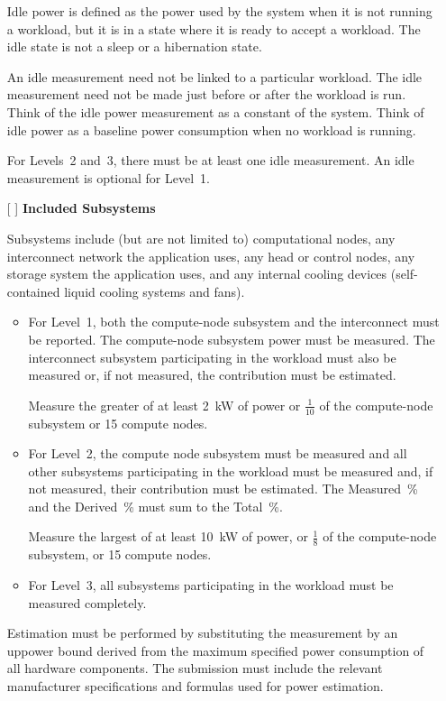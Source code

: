 \begin{itemize}
Idle power is defined as the power used by the system when it is not running a workload, but it is in a state where it is ready to accept a workload.
The idle state is not a sleep or a hibernation state.

An idle measurement need not be linked to a particular workload.
The idle measurement need not be made just before or after the workload is run.
Think of the idle power measurement as a constant of the system.
Think of idle power as a baseline power consumption when no workload is running.

For Levels~2 and~3, there must be at least one idle measurement.
An idle measurement is optional for Level~1.

\newpage
\item[{[ ]}]
\textbf{Included Subsystems}

Subsystems include (but are not limited to) computational nodes, any interconnect network the application uses, any head or control nodes, any storage system the application uses, and any internal cooling devices (self-contained liquid cooling systems and fans).

\begin{itemize}
\item
For Level~1, both the compute-node subsystem and the interconnect must be reported.
The compute-node subsystem power must be measured.
The interconnect subsystem participating in the workload must also be measured or, if not measured, the contribution must be estimated.

Measure the greater of at least 2~kW of power or $\frac{1}{10}$ of the compute-node subsystem or 15 compute nodes.

\item
For Level~2, the compute node subsystem must be measured and all other subsystems participating in the workload must be measured and, if not measured, their contribution must be estimated.
The Measured~\% and the Derived~\% must sum to the Total~\%.

Measure the largest of at least 10~kW of power, or $\frac{1}{8}$ of the compute-node subsystem, or 15 compute nodes.

\item
For Level~3, all subsystems participating in the workload must be measured completely.
\end{itemize}

Estimation must be performed by substituting the measurement by an uppower bound derived from the maximum specified power consumption of all hardware components.
The submission must include the relevant manufacturer specifications and formulas used for power estimation.


\end{itemize}
